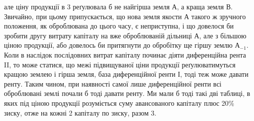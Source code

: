 \parcont{}  %
але ціну продукції в 3 реґулювала б не найгірша земля $А$, а краща
земля $В$. Звичайно, при цьому припускається, що нова земля якости $А$ такого
ж зручного положення, як оброблювана до цього часу, є неприступна, і що довелося
би зробити другу витрату капіталу на вже оброблюваній дільниці $А$, але
з більшою ціною продукції, або довелось би притягнути до обробітку ще гіршу
землю $А_{-1}$. Коли в наслідок послідовних витрат капіталу починає діяти диференційна
рента II, то може статися, що межі підвищуваної ціни продукції реґулюватимуться
кращою землею і гірша земля, база диференційної ренти І, тоді
теж може давати ренту. Таким чином, при наявності самої лише диференційної
ренти всі оброблювані землі почали б тоді давати ренту. Ми мали б тоді такі
дві таблиці, в яких під ціною продукції розуміється суму авансованого капіталу
плюс 20\%  зиску, отже на кожні 2 капіталу по 
зиску, разом 3.


